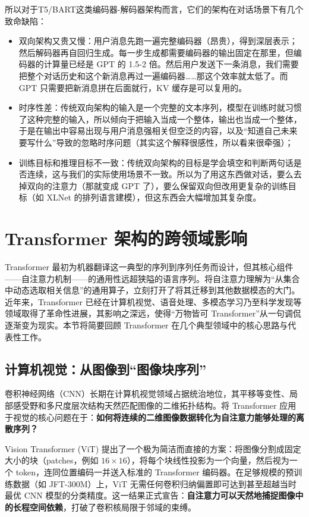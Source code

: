 所以对于T5/BART这类编码器-解码器架构而言，它们的架构在对话场景下有几个致命缺陷：
\begin{itemize}
    \item 双向架构又贵又慢：用户消息先跑一遍完整编码器（昂贵），得到深层表示；然后解码器再自回归生成。每一步生成都需要编码器的输出固定在那里，但编码器的计算量已经是 GPT 的 1.5-2 倍。然后用户发送下一条消息，我们需要把整个对话历史和这个新消息再过一遍编码器……那这个效率就太低了。而 GPT 只需要把新消息拼在后面就行，KV 缓存是可以复用的。
    \item 时序性差：传统双向架构的输入是一个完整的文本序列，模型在训练时就习惯了这种完整的输入，所以倾向于把输入当成一个整体，输出也当成一个整体，于是在输出中容易出现与用户消息强相关但空泛的内容，以及“知道自己未来要写什么”导致的忽略时序问题（其实这个解释很感性，所以看来很牵强）；
    \item 训练目标和推理目标不一致：传统双向架构的目标是学会填空和判断两句话是否连续，这与我们的实际使用场景不一致。所以为了用这东西做对话，要么去掉双向的注意力（那就变成 GPT 了），要么保留双向但改用更复杂的训练目标（如 XLNet 的排列语言建模），但这东西会大幅增加其复杂度。
\end{itemize}

\section{Transformer 架构的跨领域影响}

Transformer 最初为机器翻译这一典型的序列到序列任务而设计，但其核心组件——自注意力机制——的通用性远超狭隘的语言序列。将自注意力理解为“从集合中动态选取相关信息”的通用算子，立刻打开了将其迁移到其他数据模态的大门。近年来，Transformer 已经在计算机视觉、语音处理、多模态学习乃至科学发现等领域取得了革命性进展，其影响之深远，使得“万物皆可 Transformer”从一句调侃逐渐变为现实。本节将简要回顾 Transformer 在几个典型领域中的核心思路与代表性工作。

\subsection{计算机视觉：从图像到“图像块序列”}

卷积神经网络（CNN）长期在计算机视觉领域占据统治地位，其平移等变性、局部感受野和多尺度层次结构天然匹配图像的二维拓扑结构。将 Transformer 应用于视觉的核心问题在于：\textbf{如何将连续的二维图像数据转化为自注意力能够处理的离散序列？}

Vision Transformer (ViT)\cite{dosovitskiy2021image} 提出了一个极为简洁而直接的方案：将图像分割成固定大小的块（patches，例如 $16\times16$），将每个块线性投影为一个向量，然后视为一个 token，连同位置编码一并送入标准的 Transformer 编码器。在足够规模的预训练数据（如 JFT-300M）上，ViT 无需任何卷积归纳偏置即可达到甚至超越当时最优 CNN 模型的分类精度。这一结果正式宣告：\textbf{自注意力可以天然地捕捉图像中的长程空间依赖}，打破了卷积核局限于邻域的束缚。

